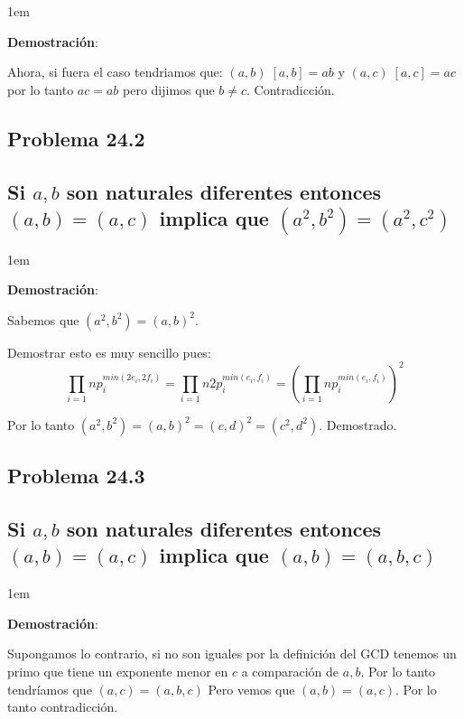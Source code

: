 \documentclass[12pt, fleqn]{article}                             %
\newenvironment{SmallIndentation}[1][0.75em]                    %
    {\begin{adjustwidth}{#1}{}\begin{footnotesize}}                 %
    {\end{footnotesize}\end{adjustwidth}}                           %
\newcommand{\Wrap}[1]{\left( #1 \right)}                        %
\begin{document}
    \begin{SmallIndentation}[1em]
        \textbf{Demostración}:
        
        Ahora, si fuera el caso tendriamos que:
        $(a,b) \; [a,b] = ab$ y $(a,c) \; [a,c] = ac$
        por lo tanto $ac=ab$ pero dijimos que $b \neq c$.
        Contradicción.
    
    \end{SmallIndentation}


    \subsection{Problema 24.2}
    \subsection*{Si $a,b$ son naturales diferentes entonces
    $(a,b) = (a,c)$ implica que $(a^2, b^2) = (a^2, c^2)$}

    \begin{SmallIndentation}[1em]
        \textbf{Demostración}:
        
        Sabemos que $(a^2, b^2) = (a, b)^2$.

        Demostrar esto es muy sencillo pues:
        \begin{equation*}
            \prod_{i=1}{n} p_i^{min(2e_i, 2f_i)}
            = \prod_{i=1}{n} 2p_i^{min(e_i, f_i)}   
            = \Wrap{\prod_{i=1}{n} p_i^{min(e_i, f_i)}}^2   
        \end{equation*}

        Por lo tanto $(a^2,b^2)=(a,b)^2=(c,d)^2=(c^2,d^2)$.
        Demostrado.
    
    \end{SmallIndentation}


    \subsection{Problema 24.3}
    \subsection*{Si $a,b$ son naturales diferentes entonces
    $(a,b) = (a,c)$ implica que $(a, b) = (a, b, c)$}

    \begin{SmallIndentation}[1em]
        \textbf{Demostración}:
        
        Supongamos lo contrario, si no son iguales por la definición
        del GCD tenemos un primo que tiene un exponente menor en $c$ a
        comparación de $a, b$. Por lo tanto tendríamos que $(a, c) = (a,b,c)$
        Pero vemos que $(a,b)=(a,c)$. Por lo tanto contradicción.

    
    \end{SmallIndentation}
\end{document}
